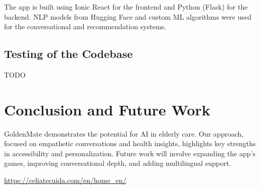 \documentclass[runningheads,a4paper,11pt]{report}
\begin{document}
The app is built using Ionic React for the frontend and Python (Flask) for the backend. NLP models from Hugging Face and custom ML algorithms were used for the conversational and recommendation systems.

\section{Testing of the Codebase}
\label{section:appTesting}

TODO

\chapter{Conclusion and Future Work}
\label{chapter:concl}

GoldenMate demonstrates the potential for AI in elderly care. Our approach, focused on empathetic conversations and health insights, highlights key strengths in accessibility and personalization. Future work will involve expanding the app's games, improving conversational depth, and adding multilingual support.



\url{https://celiatecuida.com/en/home_en/}
\end{document}
